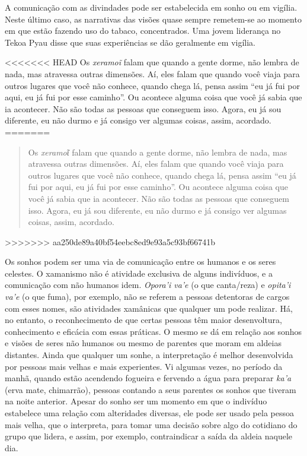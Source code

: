 A comunicação com as divindades pode ser estabelecida em sonho ou em
vigília. Neste último caso, as narrativas das visões quase sempre
remetem-se ao momento em que estão fazendo uso do tabaco, concentrados.
Uma jovem liderança no Tekoa Pyau disse que suas experiências se dão
geralmente em vigília.

<<<<<<< HEAD
Os \emph{xeramoĩ} falam que quando a gente dorme, não
lembra de nada, mas atravessa outras dimensões. Aí, eles falam que
quando você viaja para outros lugares que você não conhece, quando
chega lá, pensa assim ``eu já fui por aqui, eu já fui por esse caminho''.
Ou acontece alguma coisa que você já sabia que ia acontecer. Não são
todas as pessoas que conseguem isso. Agora, eu já sou diferente, eu não
durmo e já consigo ver algumas coisas, assim, acordado.
=======
\begin{quote}
Os \emph{xeramoῖ} falam que quando a gente dorme, não lembra de nada,
mas atravessa outras dimensões. Aí, eles falam que quando você viaja
para outros lugares que você não conhece, quando chega lá, pensa assim
``eu já fui por aqui, eu já fui por esse caminho''. Ou acontece alguma
coisa que você já sabia que ia acontecer. Não são todas as pessoas que
conseguem isso. Agora, eu já sou diferente, eu não durmo e já consigo
ver algumas coisas, assim, acordado.
\end{quote}
>>>>>>> aa250de89a40bf54eebc8ed9e93a5c93bf66741b

Os sonhos podem ser uma via de comunicação entre os humanos e os seres
celestes. O xamanismo não é atividade exclusiva de alguns indivíduos, e
a comunicação com não humanos idem. \emph{Opora’i va’e} (o que canta/reza) e
\emph{opita’i va’e} (o que fuma), por exemplo, não se referem a pessoas
detentoras de cargos com esses nomes, são atividades xamânicas que
qualquer um pode realizar. Há, no entanto, o reconhecimento de que
certas pessoas têm maior desenvoltura, conhecimento e eficácia com
essas práticas. O mesmo se dá em relação aos sonhos e visões de seres
não humanos ou mesmo de parentes que moram em aldeias distantes. Ainda
que qualquer um sonhe, a interpretação é melhor desenvolvida por
pessoas mais velhas e mais experientes. Vi algumas vezes, no período da
manhã, quando estão acendendo fogueira e fervendo a água para preparar
\emph{ka’a} (erva mate, chimarrão), pessoas contando a seus parentes os sonhos
que tiveram na noite anterior. Apesar do sonho ser um momento em que o
indivíduo estabelece uma relação com alteridades diversas, ele pode ser
usado pela pessoa mais velha, que o interpreta, para tomar uma decisão
sobre algo do cotidiano do grupo que lidera, e assim, por exemplo,
contraindicar a saída da aldeia naquele dia.

